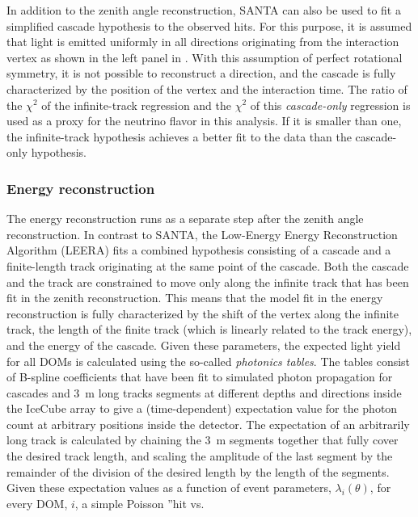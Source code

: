 In addition to the zenith angle reconstruction, SANTA can also be used to fit a simplified cascade hypothesis to the observed hits.
For this purpose, it is assumed that light is emitted uniformly in all directions originating from the interaction vertex as shown in the left panel in .
With this assumption of perfect rotational symmetry, it is not possible to reconstruct a direction, and the cascade is fully characterized by the position of the vertex and the interaction time.
The ratio of the $\chi^2$ of the infinite-track regression and the $\chi^2$ of this \emph{cascade-only} regression is used as a proxy for the neutrino flavor in this analysis.
If it is smaller than one, the infinite-track hypothesis achieves a better fit to the data than the cascade-only hypothesis.

\subsubsection{Energy reconstruction}
\label{sec:leera}
The energy reconstruction runs as a separate step after the zenith angle reconstruction.
In contrast to \textsc{SANTA}, the Low-Energy Energy Reconstruction Algorithm (LEERA)\cite{Terliuk2018Measurement} fits a combined hypothesis consisting of a cascade and a finite-length track originating at the same point of the cascade.
Both the cascade and the track are constrained to move only along the infinite track that has been fit in the zenith reconstruction.
This means that the model fit in the energy reconstruction is fully characterized by the shift of the vertex along the infinite track, the length of the finite track (which is linearly related to the track energy), and the energy of the cascade.
Given these parameters, the expected light yield for all DOMs is calculated using the so-called \emph{photonics tables}.
The tables consist of B-spline coefficients that have been fit to simulated photon propagation for cascades and 3~m long tracks segments at different depths and directions inside the IceCube array to give a (time-dependent) expectation value for the photon count at arbitrary positions inside the detector.
The expectation of an arbitrarily long track is calculated by chaining the 3~m segments together that fully cover the desired track length, and scaling the amplitude of the last segment by the remainder of the division of the desired length by the length of the segments.
Given these expectation values as a function of event parameters, $\lambda_i(\theta)$, for every DOM, $i$, a simple Poisson ''hit vs.
